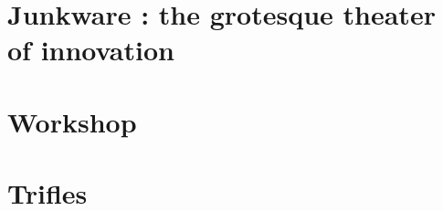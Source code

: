 \documentclass{JunkBook}
\begin{document}
\raggedbottom %
\pagestyle{plain}


\frontmatter 

\blankpage
\copyrightpage


\blankpage


\blankpage

\begin{spacing}{1}
\sommaire
\end{spacing}




\mainmatter %
\chapter{Junkware : the grotesque theater of innovation}

\chapter{Workshop}

\chapter{Trifles}

\backmatter  %

\tableofcontents
{}

% 
\nocite{*}

\end{document}
